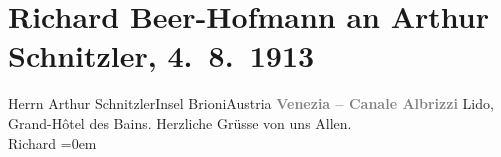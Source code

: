 

         \renewcommand{\erwaehnteOrte}{Orte: Brijuni, Canale Albrizzi, Grand Hotel des Bains, Santa Maria Elisabetta, Serbien, Venedig, Österreich}
         \renewcommand{\erwaehnteWerke}{}
               \section[Richard Beer-Hofmann an Arthur Schnitzler, 4. 8. 1913]{ Richard Beer-Hofmann an Arthur Schnitzler, 4. 8. 1913}\nopagebreak{}\rehead{ }\begin{ledgroupsized}[t]{13cm}\normalsize\beginnumbering \toendnotes[C]{\smallbreak\pagebreak[2]} 
\pstart{}{\pb}Herrn Arthur
                  Schnitzler\pend{}\pstart{}Insel Brioni\pend{}\pstart{}Austria\pend{}{\bigskip}\pstart
           \noindent{}\centering{}{\pb}\textcolor{gray}{\textbf{Venezia – Canale Albrizzi}}\pend
           \pstart
           \raggedleft{}{\pb}Lido, Grand-Hôtel des Bains.\pend
           \pstart
           Herzliche Grüsse von uns Allen.{\\[\baselineskip]}\spacefill\mbox{Richard}\pend
           \leftskip=0em{}
         
         \endnumbering{}\end{ledgroupsized}  \newcommand{\dateiname}{L02146}\newcommand{\titel}{Richard Beer-Hofmann an Arthur Schnitzler, 4. 8. 1913}\newcommand{\editorInnen}{Martin Anton Müller und Gerd-Hermann Susen}
      